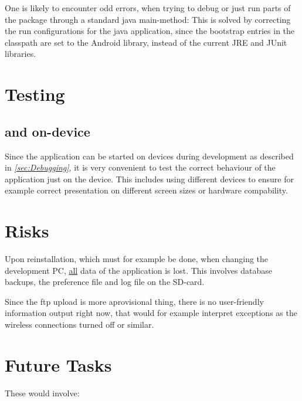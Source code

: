 \documentclass[11pt,oneside,a4paper]{scrartcl}
\begin{document}
One is likely to encounter odd errors, when trying to debug or just run parts of the package through a standard java main-method: This is solved by correcting the run configurations for the java application, since the bootstrap entries in the classpath are set to the Android library, instead of the current JRE and JUnit libraries.


\section{Testing}
\subsection{          and on-device}
Since the application can be started on devices during development as described in \textit{\ref{sec:Debugging}}, it is very convenient to test the correct behaviour of the application just on the device. This includes using different devices to ensure for example correct presentation on different screen sizes or hardware compability.

\section{Risks}
Upon reinstallation, which must for example be done, when changing the development PC, \underline{all} data of the application is lost. This involves database backups, the preference file and log file on the SD-card.

Since the ftp upload is more aprovisional thing, there is no user-friendly information output right now, that would for example interpret exceptions as the wireless connections turned off or similar.


\section{Future Tasks}
These would involve:
\end{document}
